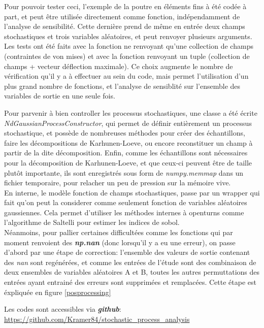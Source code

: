 \documentclass[a4paper,10pt]{article}
\begin{document}
Pour pouvoir tester ceci, l'exemple de la poutre en éléments fins à été codée à part, et peut être utilisée directement comme fonction, indépendamment de l'analyse de sensibilité. Cette dernière prend de même en entrée deux champs stochastiques et trois variables aléatoires, et peut renvoyer plusieurs arguments. Les tests ont été faits avec la fonction ne renvoyant qu'une collection de champs (contraintes de von mises) et avec la fonction renvoyant un tuple (collection de champs + vecteur déflection maximale). Ce choix augmente le nombre de vérification qu'il y a à effectuer au sein du code, mais permet l'utilisation d'un plus grand nombre de fonctions, et l'analyse de sensiblité sur l'ensemble des variables de sortie en une seule fois.

Pour parvenir à bien controller les processus stochastiques, une classe a été écrite \textit{NdGaussianProcessConstructor}, qui permet de définir entièrement un processus stochastique, et possède de nombreuses méthodes pour créer des échantillons, faire les décompositions de Karhunen-Loeve, ou encore reconstituer un champ à partir de la dite décomposition. Enfin, comme les échantillons sont nécessaires pour la décomposition de Karhunen-Loeve, et que ceux-ci peuvent être de taille plutôt importante, ils sont enregistrés sous form de \textit{numpy.memmap} dans un fichier temporaire, pour relacher un peu de pression sur la mémoire vive.\\

En interne, le modèle fonction de champs stochastiques, passe par un wrapper qui fait qu'on peut la considerer comme seulement fonction de variables aléatoires gaussiennes. Cela permet d'utiliser les méthodes internes à openturns comme l'algorithme de Saltelli pour estimer les indices de sobol. \\
\newpage
Néanmoins, pour pallier certaines difficultées comme les fonctions qui par moment renvoient des \textbf{\textit{np.nan}} (donc lorsqu'il y a eu une erreur), on passe d'abord par une étape de correction:  l'ensemble des valeurs de sortie contenant des \textit{nan} sont regénérées, et comme les entrées de l'étude sont des combinaison de deux ensembles de variables aléatoires A et B, toutes les autres permuttations des entrées ayant entrainé des erreurs sont supprimées et remplacées. Cette étape est éxpliquée en figure \ref{posprocessing} \

Les codes sont accessibles via \textit{\textbf{github}}: \\
\url{https://github.com/Kramer84/stochastic_process_analysis}
\end{document}

